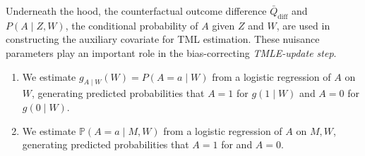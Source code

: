 \documentclass[
  12pt, krantz2,
]{book}
\makeatletter
\newenvironment{Shaded}{\begin{snugshade}}{\end{snugshade}}
\newcommand{\CommentTok}[1]{\textcolor[rgb]{0.56,0.35,0.01}{\textit{#1}}}
\newcommand{\DataTypeTok}[1]{\textcolor[rgb]{0.13,0.29,0.53}{#1}}
\newcommand{\DecValTok}[1]{\textcolor[rgb]{0.00,0.00,0.81}{#1}}
\newcommand{\KeywordTok}[1]{\textcolor[rgb]{0.13,0.29,0.53}{\textbf{#1}}}
\newcommand{\NormalTok}[1]{#1}
\newcommand{\OperatorTok}[1]{\textcolor[rgb]{0.81,0.36,0.00}{\textbf{#1}}}
\newcommand{\StringTok}[1]{\textcolor[rgb]{0.31,0.60,0.02}{#1}}
\providecommand{\tightlist}{%
  \setlength{\itemsep}{0pt}\setlength{\parskip}{0pt}}
\newenvironment{kframe}{%
\medskip{}
\setlength{\fboxsep}{.8em}
 \def\at@end@of@kframe{}%
 \ifinner\ifhmode%
  \def\at@end@of@kframe{\end{minipage}}%
  \begin{minipage}{\columnwidth}%
 \fi\fi%
 \def\FrameCommand##1{\hskip\@totalleftmargin \hskip-\fboxsep
 \colorbox{shadecolor}{##1}\hskip-\fboxsep
     \hskip-\linewidth \hskip-\@totalleftmargin \hskip\columnwidth}%
 \MakeFramed {\advance\hsize-\width
   \@totalleftmargin\z@ \linewidth\hsize
   \@setminipage}}%
 {\par\unskip\endMakeFramed%
 \at@end@of@kframe}
\renewenvironment{Shaded}{\begin{kframe}}{\end{kframe}}
\theoremstyle{definition}
\theoremstyle{definition}
\theoremstyle{definition}
\renewcommand{\P}{\mathbb{P}}
\newcommand{\1}{\mathbbm{1}}
\makeatother
\begin{document}
Underneath the hood, the counterfactual outcome difference
\(\bar{Q}_{\text{diff}}\) and \(P(A \mid Z, W)\), the conditional probability of \(A\)
given \(Z\) and \(W\), are used in constructing the auxiliary covariate for TML
estimation. These nuisance parameters play an important role in the
bias-correcting \emph{TMLE-update step}.

\begin{enumerate}
\def\labelenumi{\arabic{enumi}.}
\tightlist
\item
  We estimate \(g_{A \mid W}(W)=P(A=a \mid W)\) from a logistic regression of
  \(A\) on \(W\), generating predicted probabilities that \(A=1\) for \(g(1 \mid W)\)
  and \(A=0\) for \(g(0 \mid W)\).\\
\item
  We estimate \(\P(A=a \mid M, W)\) from a logistic regression of \(A\) on \(M, W\),
  generating predicted probabilities that \(A=1\) for and \(A=0\).
\end{enumerate}

\begin{Shaded}
\end{Shaded}
\end{document}
